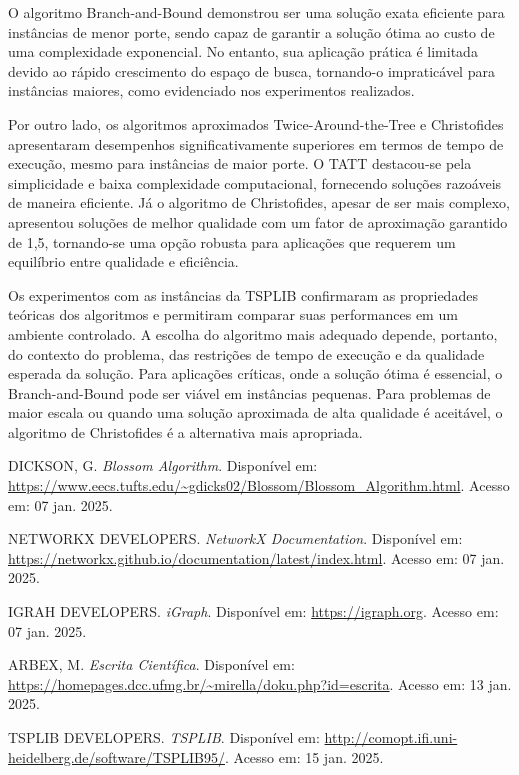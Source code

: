 \documentclass[12pt]{article}
\begin{document}
O algoritmo Branch-and-Bound demonstrou ser uma solução exata eficiente para instâncias de menor porte, sendo capaz de garantir a solução ótima ao custo de uma complexidade exponencial. No entanto, sua aplicação prática é limitada devido ao rápido crescimento do espaço de busca, tornando-o impraticável para instâncias maiores, como evidenciado nos experimentos realizados.

Por outro lado, os algoritmos aproximados Twice-Around-the-Tree e Christofides apresentaram desempenhos significativamente superiores em termos de tempo de execução, mesmo para instâncias de maior porte. O TATT destacou-se pela simplicidade e baixa complexidade computacional, fornecendo soluções razoáveis de maneira eficiente. Já o algoritmo de Christofides, apesar de ser mais complexo, apresentou soluções de melhor qualidade com um fator de aproximação garantido de 1,5, tornando-se uma opção robusta para aplicações que requerem um equilíbrio entre qualidade e eficiência.

Os experimentos com as instâncias da TSPLIB confirmaram as propriedades teóricas dos algoritmos e permitiram comparar suas performances em um ambiente controlado. A escolha do algoritmo mais adequado depende, portanto, do contexto do problema, das restrições de tempo de execução e da qualidade esperada da solução. Para aplicações críticas, onde a solução ótima é essencial, o Branch-and-Bound pode ser viável em instâncias pequenas. Para problemas de maior escala ou quando uma solução aproximada de alta qualidade é aceitável, o algoritmo de Christofides é a alternativa mais apropriada.

\begin{thebibliography}{99}

DICKSON, G. \textit{Blossom Algorithm}. Disponível em: \url{https://www.eecs.tufts.edu/~gdicks02/Blossom/Blossom_Algorithm.html}. Acesso em: 07 jan. 2025.

NETWORKX DEVELOPERS. \textit{NetworkX Documentation}. Disponível em: \url{https://networkx.github.io/documentation/latest/index.html}. Acesso em: 07 jan. 2025.

IGRAH DEVELOPERS. \textit{iGraph}. Disponível em: \url{https://igraph.org}. Acesso em: 07 jan. 2025.

ARBEX, M. \textit{Escrita Científica}. Disponível em: \url{https://homepages.dcc.ufmg.br/~mirella/doku.php?id=escrita}. Acesso em: 13 jan. 2025.

TSPLIB DEVELOPERS. \textit{TSPLIB}. Disponível em: \url{http://comopt.ifi.uni-heidelberg.de/software/TSPLIB95/}. Acesso em: 15 jan. 2025.
\\

\end{thebibliography}
\end{document}

